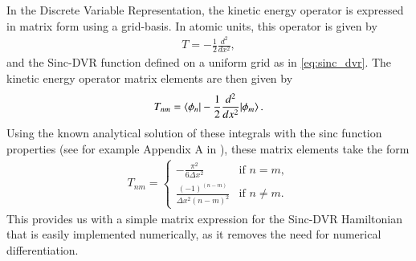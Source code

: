 \documentclass{subfiles}
\begin{document}
In the Discrete Variable Representation, the kinetic energy operator is expressed in matrix form using a grid-basis. In atomic units, this operator is given by
\begin{align*}
    T = -\frac{1}{2} \frac{d^2}{dx^2} ,
\end{align*}
and the Sinc-DVR function defined on a uniform grid as in \eqref{eq:sinc_dvr}. The kinetic energy operator matrix elements are then given by
\begin{align*}
    T_{nm} = \braket{\phi_n|-\frac{1}{2} \frac{d^2}{dx^2}|\phi_m}.
\end{align*}
Using the known analytical solution of these integrals with the sinc function properties (see for example Appendix A in \cite{colbert1992novel}), these matrix elements take the form 
\begin{align}
    T_{nm} = \begin{cases}
        -\frac{\pi^2}{6\Delta x^2} & \text{if } n = m, \\
        \frac{(-1)^{(n-m)}}{\Delta x^2(n - m)^2} & \text{if } n \neq m.
    \end{cases}\label{eq:sinc_dvr_kinetic}
\end{align}
This provides us with a simple matrix expression for the Sinc-DVR Hamiltonian that is easily implemented numerically, as it removes the need for numerical differentiation. 
\end{document}
